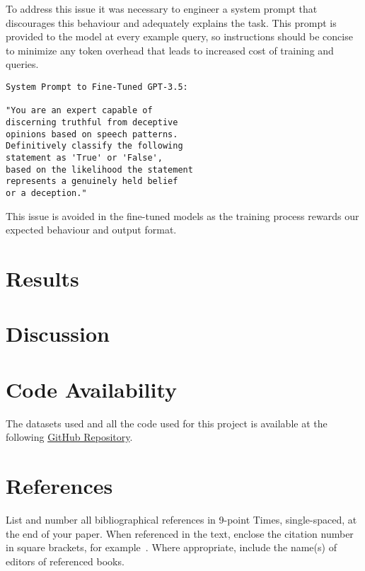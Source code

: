 \documentclass[10pt,twocolumn,letterpaper]{article}
\begin{document}
To address this issue it was necessary to engineer a system prompt that
discourages this behaviour and adequately explains the task. This prompt
is provided to the model at every example query, so instructions should
be concise to minimize any token overhead that leads to increased cost of
training and queries.

\begin{verbatim}
System Prompt to Fine-Tuned GPT-3.5:

"You are an expert capable of
discerning truthful from deceptive
opinions based on speech patterns. 
Definitively classify the following 
statement as 'True' or 'False', 
based on the likelihood the statement
represents a genuinely held belief 
or a deception."
\end{verbatim}

This issue is avoided in the fine-tuned models as the training process
rewards our expected behaviour and output format.



\section{Results}

\section{Discussion}

\section{Code Availability}
The datasets used and all the code used for this project is available
at the following \href{https://github.com/TannerAGraves/GPT-LieDetection/}{GitHub Repository}.


\section{References}

List and number all bibliographical references in 9-point Times,
single-spaced, at the end of your paper. When referenced in the text,
enclose the citation number in square brackets, for
example~\cite{Loconte}.  Where appropriate, include the name(s) of
editors of referenced books.

{\small


}
\end{document}
